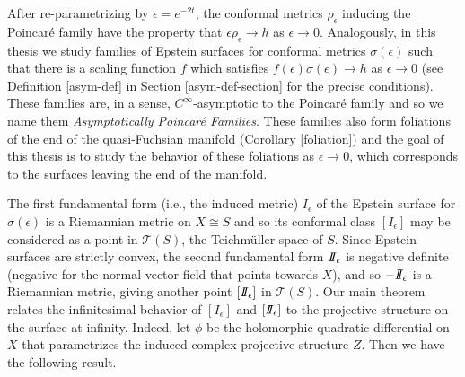 After re-parametrizing by $\epsilon = e^{-2t}$, the conformal metrics $\rho_\epsilon$ inducing the Poincar\'e family have the property that $\epsilon \rho_\epsilon \to h$ as $\epsilon \to 0$. 
Analogously, in this thesis we study families of Epstein surfaces for conformal metrics $\sigma(\epsilon)$ such that there is a scaling function $f$ which satisfies $f(\epsilon)\sigma(\epsilon) \to h$ as $\epsilon \to 0$ (see Definition \ref{asym-def} in Section \ref{asym-def-section} for the precise conditions). 
These families are, in a sense, $C^\infty$-asymptotic to the Poincar\'e family and so we name them \emph{Asymptotically Poincar\'e Families}. 
These families also form foliations of the end of the quasi-Fuchsian manifold  (Corollary \ref{foliation}) and the goal of this thesis is to study the behavior of these foliations as $ \epsilon \to 0$, which corresponds to the surfaces leaving the end of the manifold. 

The first fundamental form (i.e., the induced metric) $I_\epsilon$ of the Epstein surface for $\sigma(\epsilon)$ is a Riemannian metric on $X \cong S$ and so its conformal class $[I_\epsilon]$ may be considered as a point in $\mathcal{T}(S)$, the Teichm\"uller space of $S$. 
Since Epstein surfaces are strictly convex, the second fundamental form $I\!\!I_\epsilon$ is negative definite (negative for the normal vector field that points towards $X$), and so $-I\!\!I_\epsilon$ is a Riemannian metric, giving another point $[I\!\!I_\epsilon]$ in $\mathcal{T}(S)$.
Our main theorem relates the infinitesimal behavior of $[I_\epsilon]$ and $[I\!\!I_\epsilon]$ to the projective structure on the surface at infinity.
Indeed, let $\phi$ be the holomorphic quadratic differential on $X$ that parametrizes the induced complex projective structure $Z$.
Then we have the following result. 

